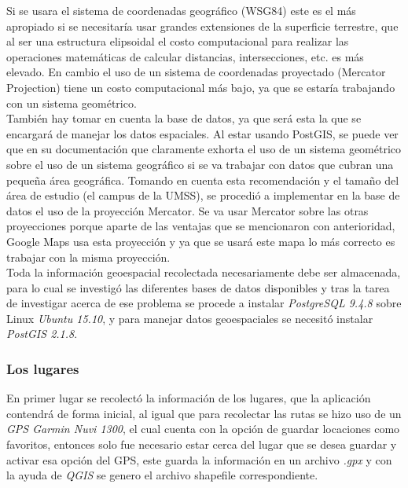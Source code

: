       Si se usara el sistema de coordenadas geográfico (WSG84) este es el más apropiado si se necesitaría usar grandes extensiones de la superficie terrestre, que al ser una estructura elipsoidal el costo computacional para realizar las operaciones matemáticas de calcular distancias, intersecciones, etc. es más elevado. En cambio el uso de un sistema de coordenadas proyectado (Mercator Projection) tiene un costo computacional más bajo, ya que se estaría trabajando con un sistema geométrico.\\

       También hay tomar en cuenta la base de datos, ya que será esta la que se encargará de manejar los datos espaciales. Al estar usando PostGIS, se puede ver que en su documentación que claramente exhorta el uso de un sistema geométrico sobre el uso de un sistema geográfico si  se va trabajar con datos que cubran una pequeña área geográfica. Tomando en cuenta esta recomendación y el tamaño del área de estudio (el campus de la UMSS), se procedió a implementar en la base de datos el uso de la proyección Mercator. Se va usar Mercator sobre las otras proyecciones porque aparte de las ventajas que se mencionaron con anterioridad, Google Maps usa esta proyección y ya que se usará este mapa lo más correcto es trabajar con la misma proyección. \\


       Toda la información geoespacial recolectada necesariamente debe ser almacenada, para lo cual se investigó las diferentes bases de datos disponibles y tras la tarea de investigar acerca de ese problema se procede a instalar \emph{PostgreSQL 9.4.8} sobre Linux \emph{Ubuntu 15.10}, y para manejar datos geoespaciales se necesitó instalar \emph{PostGIS 2.1.8}.\\


       \subsubsection{Los lugares}
       \label{subs:Los lugares}

       En primer lugar se recolectó la información de los lugares, que la aplicación contendrá  de forma inicial, al igual que para recolectar las rutas se hizo uso de un \emph{GPS Garmin Nuvi 1300}, el cual cuenta con la opción de guardar locaciones como favoritos, entonces solo fue necesario estar cerca del lugar que se desea guardar y activar esa opción del GPS, este guarda la información en un archivo \emph{.gpx} y con la ayuda de \emph{QGIS} se genero el archivo shapefile correspondiente.\\

